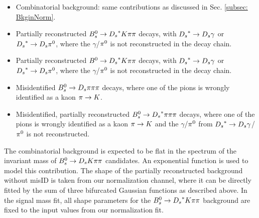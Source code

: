 \begin{itemize}

\item Combinatorial background: same contributions as discussed in Sec. \ref{subsec: BkginNorm}.

\item Partially reconstructed ${{B}^0_{s}}\rightarrow{\ensuremath{{D}_{s}}}^{*}{K}{\pi}{\pi}$ decays, with ${{D}_{s}}^{*}\rightarrow{\ensuremath{{D}_{s}}}\gamma$ or ${{D}_{s}}^{*}\rightarrow{\ensuremath{{D}_{s}}}{\ensuremath{{\pi}^0}}$, where the $\gamma$/${{\pi}^0}$ is not reconstructed in the decay chain. 

\item Partially reconstructed ${{B}^0}\rightarrow{\ensuremath{{D}_{s}}}^{*}{K}{\pi}{\pi}$ decays, with ${{D}_{s}}^{*}\rightarrow{\ensuremath{{D}_{s}}}\gamma$ or ${{D}_{s}}^{*}\rightarrow{\ensuremath{{D}_{s}}}{\ensuremath{{\pi}^0}}$, where the $\gamma$/${{\pi}^0}$ is not reconstructed in the decay chain.

\item Misidentified ${{B}^0_{s}}\rightarrow{\ensuremath{{D}_{s}}}{\ensuremath{\pi}}{\ensuremath{\pi}}{\ensuremath{\pi}}$ decays, where one of the pions is wrongly identified as a kaon ${\pi}\rightarrow{\ensuremath{K}}$.  

\item Misidentified, partially reconstructed ${{B}^0_{s}}\rightarrow{\ensuremath{{D}_{s}}}^{*}{\pi}{\pi}{\pi}$ decays, where one of the pions is wrongly identified as a kaon ${\pi}\rightarrow{\ensuremath{K}}$ and the $\gamma$/${{\pi}^0}$ from ${{D}_{s}}^{*}\rightarrow{\ensuremath{{D}_{s}}}\gamma$/${{\pi}^0}$ is 
not reconstructed.

\end{itemize}

The combinatorial background is expected to be flat in the spectrum of the invariant mass of ${{B}^0_{s}}\rightarrow{\ensuremath{{D}_{s}}}{\ensuremath{K}}{\ensuremath{\pi}}{\ensuremath{\pi}}$ candidates. An exponential function is used to model this contribution.\newline
The shape of the partially reconstructed background without misID is taken from our normalization channel, where it can be directly fitted by the sum of three bifurcated Gaussian functions as described above.
In the signal mass fit, all shape parameters for the ${{B}^0_{s}}\rightarrow{\ensuremath{{D}_{s}}}^{*}{K}{\pi}{\pi}$ background are fixed to the input values from our normalization fit.  


